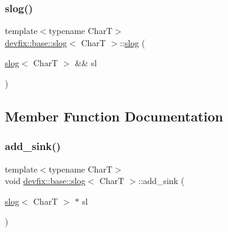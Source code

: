 \subsubsection{\texorpdfstring{slog()}{slog()}\hspace{0.1cm}{\footnotesize\ttfamily [5/5]}}
{\footnotesize\ttfamily template$<$typename CharT$>$ \\
\hyperlink{structdevfix_1_1base_1_1slog}{devfix\+::base\+::slog}$<$ CharT $>$\+::\hyperlink{structdevfix_1_1base_1_1slog}{slog} (\begin{DoxyParamCaption}\item[{\hyperlink{structdevfix_1_1base_1_1slog}{slog}$<$ CharT $>$ \&\&}]{sl }\end{DoxyParamCaption})\hspace{0.3cm}{\ttfamily [delete]}}



\subsection{Member Function Documentation}
\mbox{\label{structdevfix_1_1base_1_1slog_a4899c65f6f5192f74995be3fffe799bf}} 
\subsubsection{\texorpdfstring{add\+\_\+sink()}{add\_sink()}\hspace{0.1cm}{\footnotesize\ttfamily [1/3]}}
{\footnotesize\ttfamily template$<$typename CharT$>$ \\
void \hyperlink{structdevfix_1_1base_1_1slog}{devfix\+::base\+::slog}$<$ CharT $>$\+::add\+\_\+sink (\begin{DoxyParamCaption}\item[{\hyperlink{structdevfix_1_1base_1_1slog}{slog}$<$ CharT $>$ $\ast$}]{sl }\end{DoxyParamCaption})\hspace{0.3cm}{\ttfamily [inline]}}

\mbox{\label{structdevfix_1_1base_1_1slog_ade4230b2bd4b60aeec8935bc8217916e}} 
